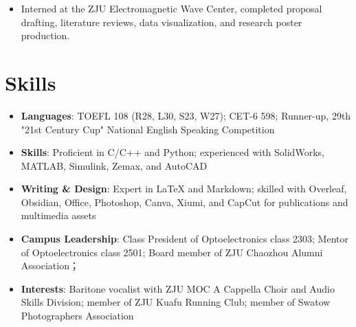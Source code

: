 \documentclass{resume}
\begin{document}
\begin{itemize}[parsep=0.5ex]
  \item Interned at the ZJU Electromagnetic Wave Center, completed proposal drafting, literature reviews, data visualization, and research poster production.
\end{itemize}

\section{Skills}
\begin{itemize}[parsep=0.5ex]
  \item \textbf{Languages}: TOEFL 108 (R28, L30, S23, W27); CET-6 598; Runner-up, 29th "21st Century Cup" National English Speaking Competition
  \item \textbf{Skills}: Proficient in C/C++ and Python; experienced with SolidWorks, MATLAB, Simulink, Zemax, and AutoCAD
  \item \textbf{Writing \& Design}: Expert in LaTeX and Markdown; skilled with Overleaf, Obsidian, Office, Photoshop, Canva, Xiumi, and CapCut for publications and multimedia assets
  \item \textbf{Campus Leadership}: Class President of Optoelectronics class 2303; Mentor of Optoelectronics class 2501; Board member of ZJU Chaozhou Alumni Association；
  \item \textbf{Interests}: Baritone vocalist with ZJU MOC A Cappella Choir and Audio Skills Division; member of ZJU Kuafu Running Club; member of Swatow Photographers Association
\end{itemize}
\end{document}
